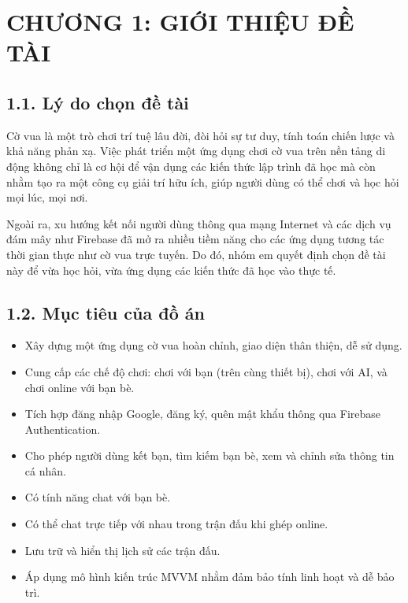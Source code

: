 \documentclass[a4paper,12pt]{article}
\begin{document}
\bigskip %


\newpage %

\setcounter{page}{1} %

\section*{\centering \textbf{CHƯƠNG 1: GIỚI THIỆU ĐỀ TÀI}} %


\subsection*{1.1. Lý do chọn đề tài} %

\justify %
\noindent Cờ vua là một trò chơi trí tuệ lâu đời, đòi hỏi sự tư duy, tính toán chiến lược và khả năng phản xạ. Việc phát triển một ứng dụng chơi cờ vua trên nền tảng di động không chỉ là cơ hội để vận dụng các kiến thức lập trình đã học mà còn nhằm tạo ra một công cụ giải trí hữu ích, giúp người dùng có thể chơi và học hỏi mọi lúc, mọi nơi.

\noindent Ngoài ra, xu hướng kết nối người dùng thông qua mạng Internet và các dịch vụ đám mây như Firebase đã mở ra nhiều tiềm năng cho các ứng dụng tương tác thời gian thực như cờ vua trực tuyến. Do đó, nhóm em quyết định chọn đề tài này để vừa học hỏi, vừa ứng dụng các kiến thức đã học vào thực tế.

\subsection*{1.2. Mục tiêu của đồ án} %

\justify
\begin{itemize}[label=·] %
    \item Xây dựng một ứng dụng cờ vua hoàn chỉnh, giao diện thân thiện, dễ sử dụng.
    \item Cung cấp các chế độ chơi: chơi với bạn (trên cùng thiết bị), chơi với AI, và chơi online với bạn bè.
    \item Tích hợp đăng nhập Google, đăng ký, quên mật khẩu thông qua Firebase Authentication.
    \item Cho phép người dùng kết bạn, tìm kiếm bạn bè, xem và chỉnh sửa thông tin cá nhân.
    \item Có tính năng chat với bạn bè.
    \item Có thể chat trực tiếp với nhau trong trận đấu khi ghép online. 
    \item Lưu trữ và hiển thị lịch sử các trận đấu.
    \item Áp dụng mô hình kiến trúc MVVM nhằm đảm bảo tính linh hoạt và dễ bảo trì.
\end{itemize}
\end{document}
